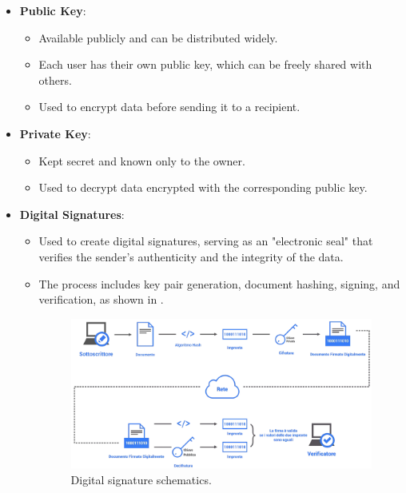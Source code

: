 \begin{itemize}
    \item \textbf{Public Key}:
    \begin{itemize}
        \item Available publicly and can be distributed widely.
        \item Each user has their own public key, which can be freely shared with others.
        \item Used to encrypt data before sending it to a recipient.
    \end{itemize}

    \item \textbf{Private Key}:
    \begin{itemize}
        \item Kept secret and known only to the owner.
        \item Used to decrypt data encrypted with the corresponding public key.
    \end{itemize}

    \item \textbf{Digital Signatures}:
    \begin{itemize}
        \item Used to create digital signatures, serving as an "electronic seal" that verifies the sender's authenticity and the integrity of the data.
        \item The process includes key pair generation, document hashing, signing, and verification, as shown in .

        \begin{figure}[h!]
            \begin{center}
                \includegraphics[width=\textwidth]{images/digital_sign.png}
                \caption{Digital signature schematics.}
                \label{fig:digital_sign}
            \end{center}
        \end{figure}
    \end{itemize}

\end{itemize}

